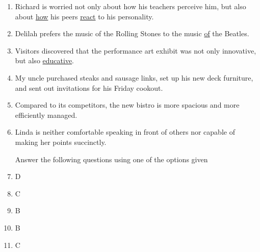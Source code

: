 \documentclass[12pt]{article}
\begin{document}
\begin{enumerate}
      \item Richard is worried not only about how his teachers perceive him, but also about \underline{how} his peers  \underline{react} to his personality.

      \item Delilah prefers the music of the Rolling Stones to the music  \underline{of} the Beatles.

      \item Visitors discovered that the performance art exhibit was not only innovative, but also  \underline{educative}.

      \item My uncle purchased steaks and sausage links, set up his new deck furniture, and  sent out invitations for his Friday cookout.

      \item Compared to its competitors, the new bistro is more spacious and  more efficiently managed.

      \item Linda is neither comfortable speaking in front of others nor  capable of making her points succinctly.

        \begin{center}
          Answer the following questions using one of the options given
        \end{center}

        \setcounter{enumi}{0}

      \item D

      \item C

      \item B

      \item B

      \item C

    \end{enumerate}
\end{document}
